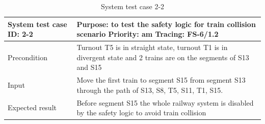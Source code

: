 \begin{table}[H]
	\caption{System test case 2-2}
	\label{table:TCase-FSS2-2}
	\begin{center}
		\renewcommand{\arraystretch}{1.8}
		\begin{tabu} 
			to 0.9 \textwidth
			{  X[0.3, l] X[l] }
			\toprule
			System test case ID: 2-2 & Purpose: to test the safety logic for train collision scenario \newline Priority: am \newline Tracing: FS-6/1.2   \\ \midrule
			Precondition             & Turnout T5 is in straight state, turnout T1 is in divergent state and 2 trains are on the segments of S13 and S15 \\
			Input                    & Move the first train to segment S15 from segment S13 through the path of S13, S8, T5, S11, T1, S15.               \\
			Expected result          & Before segment S15 the whole railway system is disabled by the safety logic to avoid train collision              \\ \bottomrule
		\end{tabu}
	\end{center}
\end{table}